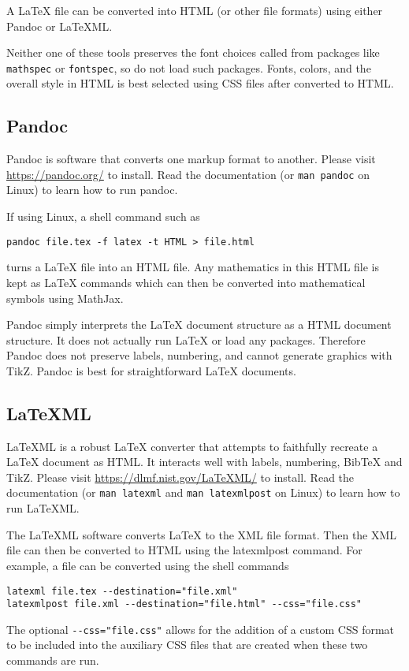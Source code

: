 \documentclass{article}
\begin{document}
A \LaTeX{} file can be converted into HTML (or other file formats) using either
Pandoc or \mbox{LaTeXML}.

Neither one of these tools preserves the font choices called from packages like
\verb~mathspec~ or \verb~fontspec~, so do not load such packages.  Fonts,
colors, and the overall style in HTML is best selected using CSS files after
converted to HTML.

\subsection{Pandoc}

Pandoc is software that converts one markup format to another.  Please visit
\url{https://pandoc.org/} to install.  Read the documentation (or
\verb~man pandoc~ on Linux) to learn how to run pandoc.

If using Linux, a shell command such as
\begin{lstlisting}
pandoc file.tex -f latex -t HTML > file.html
\end{lstlisting}
turns a \LaTeX{} file into an HTML file.  Any mathematics in this HTML file is
kept as LaTeX commands which can then be converted into mathematical symbols
using MathJax.

Pandoc simply interprets the \LaTeX{} document structure as a HTML document
structure.  It does not actually run \LaTeX{} or load any packages.  Therefore
Pandoc does not preserve labels, numbering, and cannot generate graphics with
TikZ.  Pandoc is best for straightforward \LaTeX{} documents.

\subsection{LaTeXML}

LaTeXML is a robust \LaTeX{} converter that attempts to faithfully recreate a
\LaTeX{} document as HTML.  It interacts well with labels, numbering, BibTeX
and TikZ.  Please visit \url{https://dlmf.nist.gov/LaTeXML/} to install.  Read
the documentation (or \verb~man latexml~ and \verb~man latexmlpost~ on Linux)
to learn how to run LaTeXML.

The LaTeXML software converts \LaTeX{} to the XML file format.  Then the XML
file can then be converted to HTML using the latexmlpost command.  For example,
a file can be converted using the shell commands
\begin{lstlisting}
latexml file.tex --destination="file.xml"
latexmlpost file.xml --destination="file.html" --css="file.css"
\end{lstlisting}
The optional \verb~--css="file.css"~ allows for the addition of a custom CSS
format to be included into the auxiliary CSS files that are created when these
two commands are run.
\end{document}
